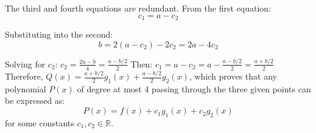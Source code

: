\documentclass{article}
\begin{document}
The third and fourth equations are redundant. From the first equation:
$$c_1 = a - c_2$$

Substituting into the second:
$$b = 2(a - c_2) - 2c_2 = 2a - 4c_2$$

Solving for $c_2$: $c_2 = \frac{2a - b}{4} = \frac{a - b/2}{2}$
Then: $c_1 = a - c_2 = a - \frac{a - b/2}{2} = \frac{a + b/2}{2}$ \\

Therefore, $Q(x) = \frac{a + b/2}{2}g_1(x) + \frac{a - b/2}{2}g_2(x)$, which proves that any polynomial $P(x)$ of degree at most 4 passing through the three given points can be expressed as:
$$P(x) = f(x) + c_1g_1(x) + c_2g_2(x)$$
for some constants $c_1, c_2 \in \mathbb{R}$.
\end{document}
